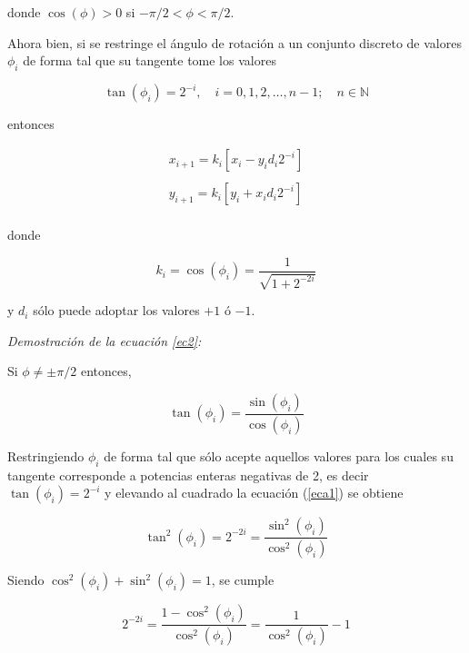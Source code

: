 donde $\cos(\phi) > 0$ si $-\pi/2 < \phi < \pi/2$.

Ahora bien, si se restringe el ángulo de rotación a un conjunto discreto de valores $\phi_{i}$ de forma tal que su
tangente tome los valores

\begin{equation}
\tan(\phi_{i})=2^{-i}, \quad	i=0,1,2,\ldots,n-1; \quad n \in \mathbb N 
\end{equation}

entonces

\begin{equation}
\label{ec3}
\begin{array}{l}
x_{i+1}=k_{i} \left[ x_{i}-y_{i} d_{i} 2^{-i}   \right]\\
\\
y_{i+1}=k_{i} \left[ y_{i}+x_{i} d_{i} 2^{-i}   \right]\\
\end{array}
\end{equation}

donde

\begin{equation}
\label{ec2}
k_{i}=\cos(\phi_{i})=\displaystyle \frac{1}{\sqrt{1+2^{-2i}}}
\end{equation}

y $d_{i}$ sólo puede adoptar los valores $+1$ ó $-1$.

\emph{Demostración de la ecuación \ref{ec2}:}

Si $\phi \ne \pm \pi/2$ entonces,

\begin{equation}
\label{eca1}
\tan{(\phi_i)}=\frac{\sin{(\phi_i)}}{\cos{(\phi_i)}}
\end{equation}

Restringiendo $\phi_i$ de forma tal que sólo acepte aquellos valores para los cuales su tangente corresponde a potencias enteras negativas de 2, es decir $\tan(\phi_i)=2^{-i}$ y elevando al cuadrado la ecuación (\ref{eca1}) se obtiene

\begin{equation}
\tan^2{(\phi_i)}=2^{-2i}=\frac{\sin^2{(\phi_i)}}{\cos^2{(\phi_i)}}
\end{equation}

Siendo $\cos^2{(\phi_i)} + \sin^2{(\phi_i)} = 1$, se cumple

\begin{equation}
2^{-2i}=\frac{1-\cos^2{(\phi_i)}}{\cos^2{(\phi_i)}}=\frac{1}{\cos^2{(\phi_i)}}-1
\end{equation}

